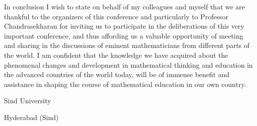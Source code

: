 In conclusion I wish to state on behalf of my colleagues and myself that we are thankful to the organizers of this conference and particularly to Professor Chandrasekharan for inviting us to participate in the deliberations of this very important conference, and thus affording us a valuable opportunity of meeting and sharing in the discussions of eminent mathematicians from different parts of the world. I am confident that the knowledge we have acquired about the phenomenal changes and development in mathematical thinking and education in the advanced countries of the world today, will be of immense benefit and assistance in shaping the course of mathematical education in our own country.

\bigskip
\medskip
{\fontsize{9pt}{11pt}\selectfont
Sind University

Hyderabad (Sind)
}\relax
